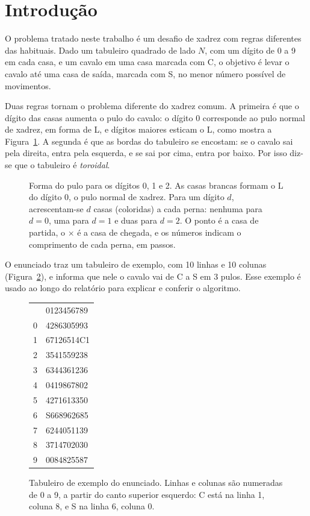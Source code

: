 \section{Introdução}
\label{sec:introducao}

O problema tratado neste trabalho é um desafio de xadrez com regras diferentes das habituais.
Dado um tabuleiro quadrado de lado $N$, com um dígito de 0 a 9 em cada casa, e um cavalo em
uma casa marcada com C, o objetivo é levar o cavalo até uma casa de saída, marcada com S, no
menor número possível de movimentos.

Duas regras tornam o problema diferente do xadrez comum. A primeira é que o dígito das casas
aumenta o pulo do cavalo: o dígito 0 corresponde ao pulo normal de xadrez, em forma de L, e
dígitos maiores esticam o L, como mostra a Figura~\ref{fig:pulos}. A segunda é que as bordas
do tabuleiro se encostam: se o cavalo sai pela direita, entra pela esquerda, e se sai por
cima, entra por baixo. Por isso diz-se que o tabuleiro é \emph{toroidal}.

\begin{figure}[ht]
  \centering
  
  \caption{Forma do pulo para os dígitos 0, 1 e 2. As casas brancas formam o L do dígito 0, o pulo
  normal de xadrez. Para um dígito $d$, acrescentam-se $d$ casas (coloridas) a cada perna: nenhuma
  para $d = 0$, uma para $d = 1$ e duas para $d = 2$. O ponto é a casa de partida, o $\times$ é a
  casa de chegada, e os números indicam o comprimento de cada perna, em passos.}
  \label{fig:pulos}
\end{figure}

O enunciado traz um tabuleiro de exemplo, com 10 linhas e 10 colunas
(Figura~\ref{fig:exemplo}), e informa que nele o cavalo vai de C a S em 3 pulos. Esse
exemplo é usado ao longo do relatório para explicar e conferir o algoritmo.

\begin{figure}[ht]
  \centering
  \ttfamily
  \begin{tabular}{@{}r@{\hspace{1.2em}}l@{}}
     & 0123456789\\
    0 & 4286305993\\
    1 & 67126514C1\\
    2 & 3541559238\\
    3 & 6344361236\\
    4 & 0419867802\\
    5 & 4271613350\\
    6 & S668962685\\
    7 & 6244051139\\
    8 & 3714702030\\
    9 & 0084825587\\
  \end{tabular}
  \caption{Tabuleiro de exemplo do enunciado. Linhas e colunas são numeradas de 0 a 9, a partir do
  canto superior esquerdo: C está na linha 1, coluna 8, e S na linha 6, coluna 0.}
  \label{fig:exemplo}
\end{figure}

